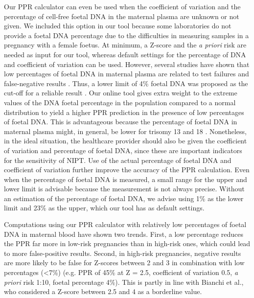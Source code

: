 Our PPR calculator can even be used when the coefficient of variation and the percentage of cell-free foetal DNA in the maternal plasma are unknown or not given. 
We included this option in our tool because some laboratories do not provide a foetal DNA percentage due to the difficulties in measuring samples in a pregnancy with a female foetus. 
At minimum, a Z-score and the \textsl{a priori} risk are needed as input for our tool, whereas default settings for the percentage of DNA and coefficient of variation can be used. 
However, several studies have shown that low percentages of foetal DNA in maternal plasma are related to test failures and false-negative results \cite{Canick_2012,Bianchi_2013}. 
Thus, a lower limit of 4\% foetal DNA was proposed as the cut-off for a reliable result \cite{Fairbrother_2013,Norton_2012}. 
Our online tool gives extra weight to the extreme values of the DNA foetal percentage in the population compared to a normal distribution to yield a higher PPR prediction in the presence of low percentages of foetal DNA. 
This is advantageous because the percentage of foetal DNA in maternal plasma might, in general, be lower for trisomy 13 and 18 \cite{Fairbrother_2013,Hall_2014,Wegrzyn_2005,Palomaki_2015}. 
Nonetheless, in the ideal situation, the healthcare provider should also be given the coefficient of variation and percentage of foetal DNA, since these are important indicators for the sensitivity of NIPT.
Use of the actual percentage of foetal DNA and coefficient of variation further improve the accuracy of the PPR calculation. 
Even when the percentage of foetal DNA is measured, a small range for the upper and lower limit is advisable because the measurement is not always precise. Without an estimation of the percentage of foetal DNA, we advise using 1\% as the lower limit and 23\% as the upper, which our tool has as default settings.

Computations using our PPR calculator with relatively low percentages of foetal DNA in maternal blood have shown two trends. 
First, a low percentage reduces the PPR far more in low-risk pregnancies than in high-risk ones, which could lead to more false-positive results. Second, in high-risk pregnancies, negative results are more likely to be false for Z-scores between 2 and 3 in combination with low percentages (\textless7\%) (e.g. PPR of 45\% at Z = 2.5, coefficient of variation 0.5, \textsl{a priori} risk 1:10, foetal percentage 4\%). 
This is partly in line with Bianchi et al.\cite{Bianchi_2012}, who considered a Z-score between 2.5 and 4 as a borderline value.

